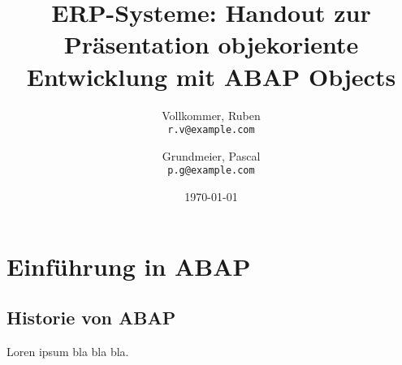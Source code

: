 \documentclass[12pt,a4paper]{scrartcl}
\begin{document}
\title{ERP-Systeme: Handout zur Präsentation objekoriente Entwicklung mit ABAP Objects}

\author{
  Vollkommer, Ruben\\
  \texttt{r.v@example.com}
  \and
  Grundmeier, Pascal\\
  \texttt{p.g@example.com}
}


\date{\today}
\maketitle

\newpage
\tableofcontents
\newpage

\section{Einführung in ABAP}
\subsection{Historie von ABAP}
Loren ipsum bla bla bla.
\end{document}
